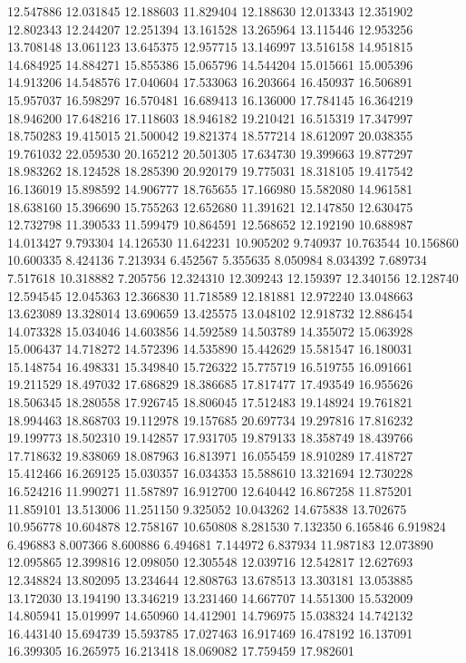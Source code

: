 12.547886
12.031845
12.188603
11.829404
12.188630
12.013343
12.351902
12.802343
12.244207
12.251394
13.161528
13.265964
13.115446
12.953256
13.708148
13.061123
13.645375
12.957715
13.146997
13.516158
14.951815
14.684925
14.884271
15.855386
15.065796
14.544204
15.015661
15.005396
14.913206
14.548576
17.040604
17.533063
16.203664
16.450937
16.506891
15.957037
16.598297
16.570481
16.689413
16.136000
17.784145
16.364219
18.946200
17.648216
17.118603
18.946182
19.210421
16.515319
17.347997
18.750283
19.415015
21.500042
19.821374
18.577214
18.612097
20.038355
19.761032
22.059530
20.165212
20.501305
17.634730
19.399663
19.877297
18.983262
18.124528
18.285390
20.920179
19.775031
18.318105
19.417542
16.136019
15.898592
14.906777
18.765655
17.166980
15.582080
14.961581
18.638160
15.396690
15.755263
12.652680
11.391621
12.147850
12.630475
12.732798
11.390533
11.599479
10.864591
12.568652
12.192190
10.688987
14.013427
9.793304
14.126530
11.642231
10.905202
9.740937
10.763544
10.156860
10.600335
8.424136
7.213934
6.452567
5.355635
8.050984
8.034392
7.689734
7.517618
10.318882
7.205756
12.324310
12.309243
12.159397
12.340156
12.128740
12.594545
12.045363
12.366830
11.718589
12.181881
12.972240
13.048663
13.623089
13.328014
13.690659
13.425575
13.048102
12.918732
12.886454
14.073328
15.034046
14.603856
14.592589
14.503789
14.355072
15.063928
15.006437
14.718272
14.572396
14.535890
15.442629
15.581547
16.180031
15.148754
16.498331
15.349840
15.726322
15.775719
16.519755
16.091661
19.211529
18.497032
17.686829
18.386685
17.817477
17.493549
16.955626
18.506345
18.280558
17.926745
18.806045
17.512483
19.148924
19.761821
18.994463
18.868703
19.112978
19.157685
20.697734
19.297816
17.816232
19.199773
18.502310
19.142857
17.931705
19.879133
18.358749
18.439766
17.718632
19.838069
18.087963
16.813971
16.055459
18.910289
17.418727
15.412466
16.269125
15.030357
16.034353
15.588610
13.321694
12.730228
16.524216
11.990271
11.587897
16.912700
12.640442
16.867258
11.875201
11.859101
13.513006
11.251150
9.325052
10.043262
14.675838
13.702675
10.956778
10.604878
12.758167
10.650808
8.281530
7.132350
6.165846
6.919824
6.496883
8.007366
8.600886
6.494681
7.144972
6.837934
11.987183
12.073890
12.095865
12.399816
12.098050
12.305548
12.039716
12.542817
12.627693
12.348824
13.802095
13.234644
12.808763
13.678513
13.303181
13.053885
13.172030
13.194190
13.346219
13.231460
14.667707
14.551300
15.532009
14.805941
15.019997
14.650960
14.412901
14.796975
15.038324
14.742132
16.443140
15.694739
15.593785
17.027463
16.917469
16.478192
16.137091
16.399305
16.265975
16.213418
18.069082
17.759459
17.982601

